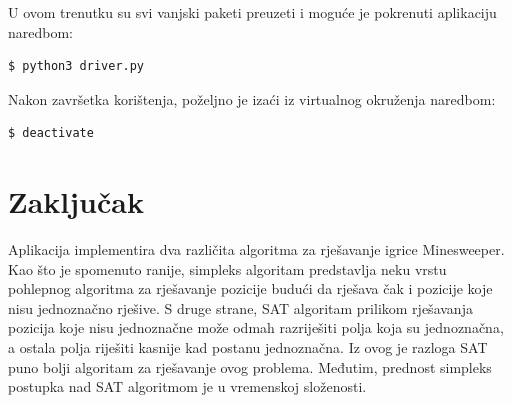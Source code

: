 \documentclass{article}
\numberwithin{figure}{section}
\numberwithin{table}{section}
\begin{document}
U ovom trenutku su svi vanjski paketi preuzeti i moguće je pokrenuti aplikaciju naredbom:
\begin{verbatim}
$ python3 driver.py
\end{verbatim}

Nakon završetka korištenja, poželjno je izaći iz virtualnog okruženja naredbom:
\begin{verbatim}
$ deactivate
\end{verbatim}


\section{Zaključak}

Aplikacija implementira dva različita algoritma za rješavanje igrice Minesweeper.
Kao što je spomenuto ranije, simpleks algoritam predstavlja neku vrstu pohlepnog algoritma
za rješavanje pozicije budući da rješava čak i pozicije koje nisu jednoznačno rješive.
S druge strane, SAT algoritam prilikom rješavanja pozicija koje nisu jednoznačne može
odmah razriješiti polja koja su jednoznačna, a ostala polja riješiti kasnije kad
postanu jednoznačna. Iz ovog je razloga SAT puno bolji algoritam za rješavanje ovog
problema. Međutim, prednost simpleks postupka nad SAT algoritmom je u vremenskoj složenosti.

\printbibliography
\end{document}

